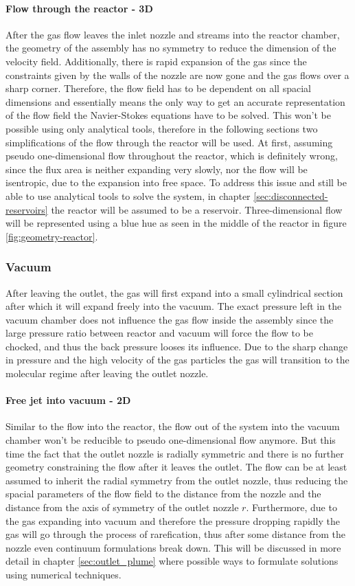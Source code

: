 	\paragraph*{Flow through the reactor - 3D}
		After the gas flow leaves the inlet nozzle and streams into the reactor chamber, the geometry of the assembly has no symmetry to reduce the dimension of the velocity field.
		Additionally, there is rapid expansion of the gas since the constraints given by the walls of the nozzle are now gone and the gas flows over a sharp corner.
		Therefore, the flow field has to be dependent on all spacial dimensions and essentially means the only way to get an accurate representation of the flow field the Navier-Stokes equations have to be solved.
		This won't be possible using only analytical tools, therefore in the following sections two simplifications of the flow through the reactor will be used.
		At first, assuming pseudo one-dimensional flow throughout the reactor, which is definitely wrong, since the flux area is neither expanding very slowly, nor the flow will be isentropic, due to the expansion into free space.
		To address this issue and still be able to use analytical tools to solve the system, in chapter \ref{sec:disconnected-reservoirs} the reactor will be assumed to be a reservoir.
		Three-dimensional flow will be represented using a blue hue as seen in the middle of the reactor in figure \ref{fig:geometry-reactor}.

\subsubsection*{Vacuum}
	After leaving the outlet, the gas will first expand into a small cylindrical section after which it will expand freely into the vacuum.
	The exact pressure left in the vacuum chamber does not influence the gas flow inside the assembly since the large pressure ratio between reactor and vacuum will force the flow to be chocked, and thus the back pressure looses its influence.
	Due to the sharp change in pressure and the high velocity of the gas particles the gas will transition to the molecular regime after leaving the outlet nozzle.

	\paragraph{Free jet into vacuum - 2D}
		Similar to the flow into the reactor, the flow out of the system into the vacuum chamber won't be reducible to pseudo one-dimensional flow anymore.
		But this time the fact that the outlet nozzle is radially symmetric and there is no further geometry constraining the flow after it leaves the outlet.
		The flow can be at least assumed to inherit the radial symmetry from the outlet nozzle, thus reducing the spacial parameters of the flow field to the distance from the nozzle and the distance from the axis of symmetry of the outlet nozzle $r$.
		Furthermore, due to the gas expanding into vacuum and therefore the pressure dropping rapidly the gas will go through the process of rarefication, thus after some distance from the nozzle even continuum formulations break down.
		This will be discussed in more detail in chapter \ref{sec:outlet_plume} where possible ways to formulate solutions using numerical techniques.
		\cite{anderson2021modern}
